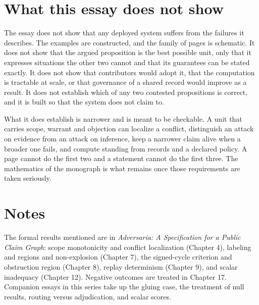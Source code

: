 \documentclass[11pt]{article}
\begin{document}
\section{What this essay does not show}\label{sec:limits}

The essay does not show that any deployed system suffers from the failures it describes. The examples are constructed, and the family of pages is schematic. It does not show that the argued proposition is the best possible unit, only that it expresses situations the other two cannot and that its guarantees can be stated exactly. It does not show that contributors would adopt it, that the computation is tractable at scale, or that governance of a shared record would improve as a result. It does not establish which of any two contested propositions is correct, and it is built so that the system does not claim to.

What it does establish is narrower and is meant to be checkable. A unit that carries scope, warrant and objection can localize a conflict, distinguish an attack on evidence from an attack on inference, keep a narrower claim alive when a broader one fails, and compute standing from records and a declared policy. A page cannot do the first two and a statement cannot do the first three. The mathematics of the monograph is what remains once those requirements are taken seriously.

\section*{Notes}

The formal results mentioned are in \emph{Adversaria: A Specification for a Public Claim Graph}: scope monotonicity and conflict localization (Chapter 4), labeling and regions and non-explosion (Chapter 7), the signed-cycle criterion and obstruction region (Chapter 8), replay determinism (Chapter 9), and scalar inadequacy (Chapter 12). Negative outcomes are treated in Chapter 17. Companion essays in this series take up the gluing case, the treatment of null results, routing versus adjudication, and scalar scores.
\end{document}
